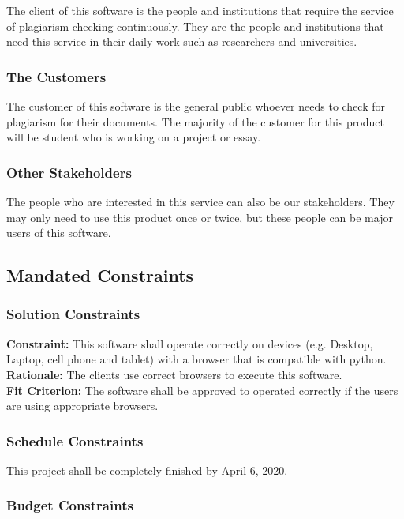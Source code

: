 \documentclass[12pt, titlepage]{article}
\begin{document}
The client of this software is the people and institutions that require the service of plagiarism checking continuously. They are the people and institutions that need this service in their daily work such as researchers and universities.

\subsubsection{The Customers}

The customer of this software is the general public whoever needs to check for plagiarism for their documents. The majority of the customer for this product will be student who is working on a project or essay.

\subsubsection{Other Stakeholders}

The people who are interested in this service can also be our stakeholders. They may only need to use this product once or twice, but these people can be major users of this software.

\subsection{Mandated Constraints}

\subsubsection{Solution Constraints}

{\bf Constraint:} This software shall operate correctly on devices (e.g. Desktop, Laptop, cell phone and tablet) with a browser that is compatible with python. \\
{\bf Rationale:} The clients use correct browsers to execute this software. \\
{\bf Fit Criterion:} The software shall be approved to operated correctly if the users are using appropriate browsers.

\subsubsection{Schedule Constraints}

This project shall be completely finished by April 6, 2020.

\subsubsection{Budget Constraints}
\end{document}

